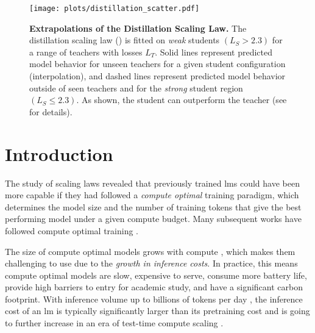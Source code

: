 \begin{figure}[t]
	\centering
	\texttt{[image: plots/distillation\_scatter.pdf]}
        \vspace{-0.1cm}
	\caption{\textbf{Extrapolations of the Distillation Scaling Law.}
		The distillation scaling law () is fitted on \emph{weak} students $(L_S > 2.3)$ for a range of teachers with losses $L_T$. Solid lines represent predicted model behavior for unseen teachers for a given student configuration (interpolation), and dashed lines represent predicted model behavior outside of seen teachers and for the \emph{strong} student region $(L_S \leq 2.3)$.
        As shown, the student can outperform the teacher (see  for details).
	}
        \vspace{-0.1cm}
	\label{fig:distillation-scaling-law-fig1}
\end{figure}

\section{Introduction}
\label{sec:introduction}

The study of scaling laws \citep{DBLP:journals/corr/abs-1712-00409,DBLP:conf/iclr/RosenfeldRBS20,DBLP:journals/corr/abs-2001-08361,DBLP:journals/corr/abs-2203-15556}
revealed that
previously trained \glspl{lm} could have been more capable if they had followed a \emph{compute optimal} training paradigm, which determines the model size and the number of training tokens that give the best performing model under a given compute budget.
Many subsequent works have followed compute optimal training \citep{DBLP:journals/corr/abs-2304-03208,DBLP:conf/nips/MuennighoffRBST23}.

The size of compute optimal models grows with compute \citep{DBLP:journals/corr/abs-2203-15556},
which makes them challenging to use due to the  \emph{growth in inference costs}.
In practice, this means compute optimal models are slow, expensive to serve, consume more battery life, provide high barriers to entry for academic study, and have a significant carbon footprint.
With inference volume up to billions of tokens per day \citep{openai_blog_gpt3},
the inference cost of an \gls{lm} is typically significantly larger than its pretraining cost  \citep{DBLP:conf/hotcarbon/ChienLNRSW23,DBLP:journals/micro/WuARH24}
and is going to further increase in an era of test-time compute scaling
\citep{DBLP:journals/corr/abs-2408-03314,DBLP:journals/corr/abs-2407-21787,DBLP:journals/corr/abs-2408-00724}.

